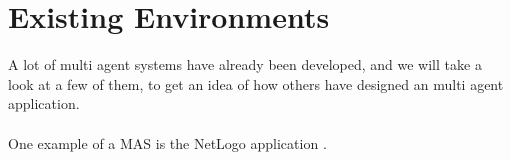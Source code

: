 \section{Existing Environments}

A lot of multi agent systems have already been developed, and we will take a look at a few of them, to get an idea of how others have designed an multi agent application.\\
\\
One example of a MAS is the NetLogo application \cite{misc:netlogo}.